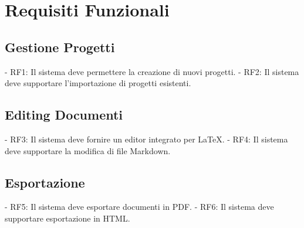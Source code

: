 \section{Requisiti Funzionali}

\subsection{Gestione Progetti}

- RF1: Il sistema deve permettere la creazione di nuovi progetti.
- RF2: Il sistema deve supportare l'importazione di progetti esistenti.

\subsection{Editing Documenti}

- RF3: Il sistema deve fornire un editor integrato per LaTeX.
- RF4: Il sistema deve supportare la modifica di file Markdown.

\subsection{Esportazione}

- RF5: Il sistema deve esportare documenti in PDF.
- RF6: Il sistema deve supportare esportazione in HTML.